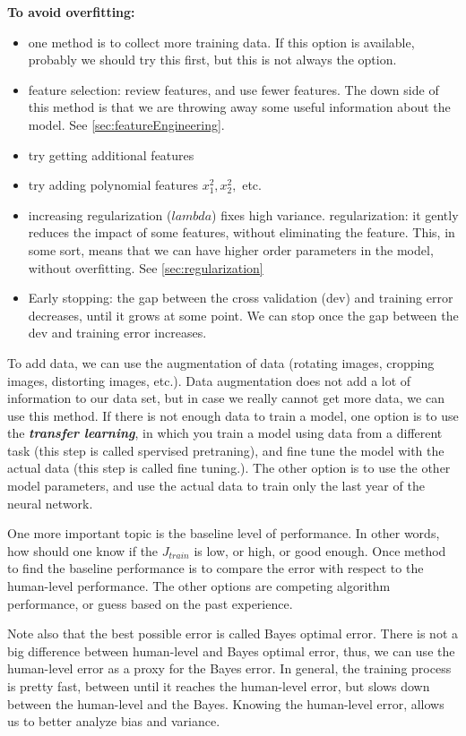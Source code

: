 \documentclass[12pt]{report}
\begin{document}
\textbf{To avoid overfitting:}
\begin{itemize}
\item one method is to collect more training data. If this option is available, probably we should try this first, but this is not always the option.
\item feature selection: review features, and use fewer features. The down side of this method is that we are throwing away some useful information about the model. See \ref{sec:featureEngineering}.
\item try getting additional features
\item try adding polynomial features $x_1^2, x_2^2, $ etc.
\item increasing regularization ($lambda$) fixes high variance. regularization: it gently reduces the impact of some features, without eliminating the feature. This, in some sort, means that we can have higher order parameters in the model, without overfitting. See \ref{sec:regularization}
\item Early stopping: the gap between the cross validation (dev) and training error decreases, until it grows at some point. We can stop once the gap between the dev and training error increases.
\end{itemize}


To add data, we can use the augmentation of data (rotating images, cropping images, distorting images, etc.). Data augmentation does not add a lot of information to our data set, but in case we really cannot get more data, we can use this method.  If there is not enough data to train a model, one option is to use the \textbf{\textit{transfer learning}}, in which you train a model using data from a different task (this step is called spervised pretraning), and fine tune the model with the actual data (this step is called fine tuning.). The other option is to use the other model parameters, and use the actual data to train only the last year of the neural network.

One more important topic is the baseline level of performance. In other words, how should one know if the $J_{train}$ is low, or high, or good enough. Once method to find the baseline performance is to compare the error with respect to the human-level performance. The other options are competing algorithm performance, or guess based on the past experience.

Note also that the best possible error is called Bayes optimal error. There is not a big difference between human-level and Bayes optimal error, thus, we can use the human-level error as a proxy for the Bayes error. In general, the training process is pretty fast, between until it reaches the human-level error, but slows down between the human-level and the Bayes. Knowing the human-level error, allows us to better analyze bias and variance.
\end{document}
